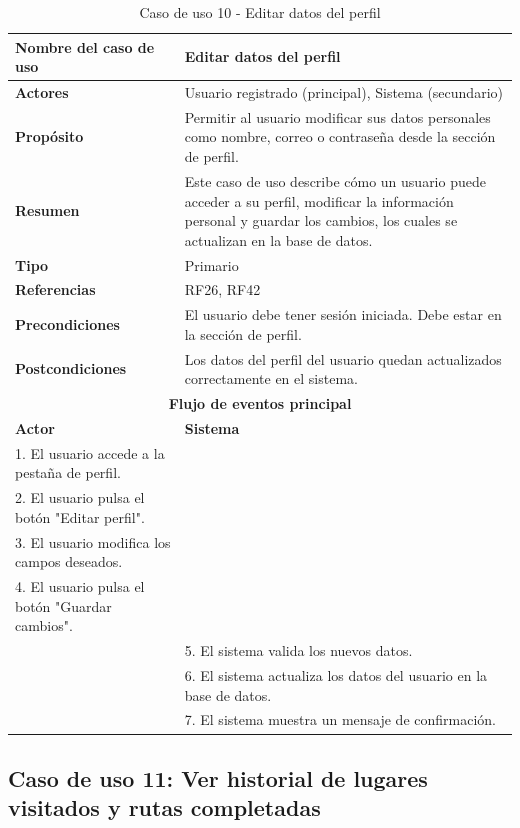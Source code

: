 \begin{table}[H]
\centering
\caption{Caso de uso 10 - Editar datos del perfil}
\begin{tabular}{|p{4.5cm}|p{10.5cm}|}
\hline
\textbf{Nombre del caso de uso} & Editar datos del perfil \\
\hline
\textbf{Actores} & Usuario registrado (principal), Sistema (secundario) \\
\hline
\textbf{Propósito} & Permitir al usuario modificar sus datos personales como nombre, correo o contraseña desde la sección de perfil. \\
\hline
\textbf{Resumen} & Este caso de uso describe cómo un usuario puede acceder a su perfil, modificar la información personal y guardar los cambios, los cuales se actualizan en la base de datos. \\
\hline
\textbf{Tipo} & Primario \\
\hline
\textbf{Referencias} & RF26, RF42 \\
\hline
\textbf{Precondiciones} & El usuario debe tener sesión iniciada. Debe estar en la sección de perfil. \\
\hline
\textbf{Postcondiciones} & Los datos del perfil del usuario quedan actualizados correctamente en el sistema. \\
\hline
\multicolumn{2}{|c|}{\textbf{Flujo de eventos principal}} \\
\hline
\textbf{Actor} & \textbf{Sistema} \\
\hline
1. El usuario accede a la pestaña de perfil. & \\
\hline
2. El usuario pulsa el botón "Editar perfil". & \\
\hline
3. El usuario modifica los campos deseados. & \\
\hline
4. El usuario pulsa el botón "Guardar cambios". & \\
\hline
& 5. El sistema valida los nuevos datos. \\
\hline
& 6. El sistema actualiza los datos del usuario en la base de datos. \\
\hline
& 7. El sistema muestra un mensaje de confirmación. \\
\hline
\end{tabular}
\end{table}

\subsection{Caso de uso 11: Ver historial de lugares visitados y rutas completadas}

